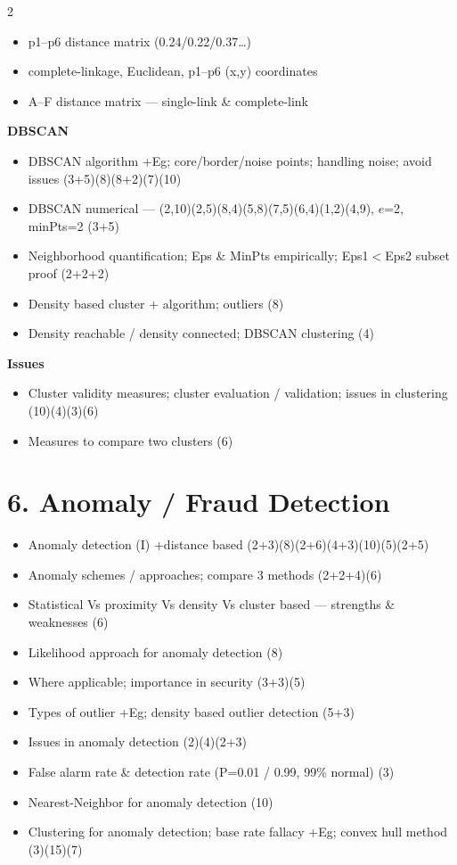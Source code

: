 \documentclass[10pt]{article}
\begin{document}
\begin{multicols}{2}
\begin{itemize}
    \begin{itemize}
      \item p1--p6 distance matrix (0.24/0.22/0.37\dots)
      \item complete-linkage, Euclidean, p1--p6 (x,y) coordinates
      \item A--F distance matrix --- single-link \& complete-link
    \end{itemize}
\end{itemize}
\textbf{DBSCAN}
\begin{itemize}
  \item DBSCAN algorithm +Eg; core/border/noise points; handling noise; avoid issues \hfill (3+5)(8)(8+2)(7)(10)
  \item DBSCAN numerical --- (2,10)(2,5)(8,4)(5,8)(7,5)(6,4)(1,2)(4,9), $e$=2, minPts=2 \hfill (3+5)
  \item Neighborhood quantification; Eps \& MinPts empirically; Eps1$<$Eps2 subset proof \hfill (2+2+2)
  \item Density based cluster + algorithm; outliers \hfill (8)
  \item Density reachable / density connected; DBSCAN clustering \hfill (4)
\end{itemize}
\textbf{Issues}
\begin{itemize}
  \item Cluster validity measures; cluster evaluation / validation; issues in clustering \hfill (10)(4)(3)(6)
  \item Measures to compare two clusters \hfill (6)
\end{itemize}

\section*{6. Anomaly / Fraud Detection}
\begin{itemize}
  \item Anomaly detection (I) +distance based \hfill (2+3)(8)(2+6)(4+3)(10)(5)(2+5)
  \item Anomaly schemes / approaches; compare 3 methods \hfill (2+2+4)(6)
  \item Statistical Vs proximity Vs density Vs cluster based --- strengths \& weaknesses \hfill (6)
  \item Likelihood approach for anomaly detection \hfill (8)
  \item Where applicable; importance in security \hfill (3+3)(5)
  \item Types of outlier +Eg; density based outlier detection \hfill (5+3)
  \item Issues in anomaly detection \hfill (2)(4)(2+3)
  \item False alarm rate \& detection rate (P=0.01 / 0.99, 99\% normal) \hfill (3)
  \item Nearest-Neighbor for anomaly detection \hfill (10)
  \item Clustering for anomaly detection; base rate fallacy +Eg; convex hull method \hfill (3)(15)(7)
\end{itemize}


\end{multicols}
\end{document}
